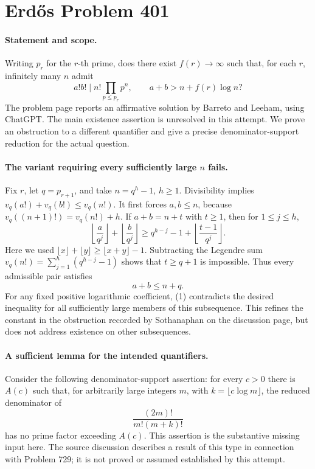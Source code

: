 \section*{Erd\H{o}s Problem 401}

\paragraph{Statement and scope.}
Writing \(p_r\) for the \(r\)-th prime, does there exist \(f(r)\to\infty\)
such that, for each \(r\), infinitely many \(n\) admit
\[
 a!b!\mid n!\prod_{p\leq p_r}p^n,\qquad
 a+b>n+f(r)\log n?
\]
The problem page reports an affirmative solution by Barreto and Leeham,
using ChatGPT. The main existence assertion is unresolved in this attempt.
We prove an obstruction to a different quantifier and give a precise
denominator-support reduction for the actual question.

\paragraph{The variant requiring every sufficiently large \(n\) fails.}
Fix \(r\), let \(q=p_{r+1}\), and take \(n=q^h-1\), \(h\geq1\).
Divisibility implies \(v_q(a!)+v_q(b!)\leq v_q(n!)\).
It first forces \(a,b\leq n\), because
\(v_q((n+1)!)=v_q(n!)+h\).
If \(a+b=n+t\) with \(t\geq1\), then for \(1\leq j\leq h\),
\[
 \left\lfloor\frac{a}{q^j}\right\rfloor+
 \left\lfloor\frac{b}{q^j}\right\rfloor
 \geq q^{h-j}-1+\left\lfloor\frac{t-1}{q^j}\right\rfloor.
\]
Here we used \(\lfloor x\rfloor+\lfloor y\rfloor\geq\lfloor x+y\rfloor-1\).
Subtracting the Legendre sum
\(v_q(n!)=\sum_{j=1}^{h}(q^{h-j}-1)\) shows that \(t\geq q+1\)
is impossible. Thus every admissible pair satisfies
\[
 a+b\leq n+q.
 \tag{1}
\]
For any fixed positive logarithmic coefficient, (1) contradicts the desired
inequality for all sufficiently large members of this subsequence.
This refines the constant in the obstruction recorded by
Sothanaphan on the discussion page, but does not address existence on
other subsequences.

\paragraph{A sufficient lemma for the intended quantifiers.}
Consider the following denominator-support assertion:
for every \(c>0\) there is \(A(c)\) such that, for arbitrarily large
integers \(m\), with \(k=\lfloor c\log m\rfloor\), the reduced denominator
of
\[
 \frac{(2m)!}{m!(m+k)!}
 \tag{2}
\]
has no prime factor exceeding \(A(c)\).
This assertion is the substantive missing input here. The source
discussion describes a result of this type in connection with Problem 729;
it is not proved or assumed established by this attempt.

